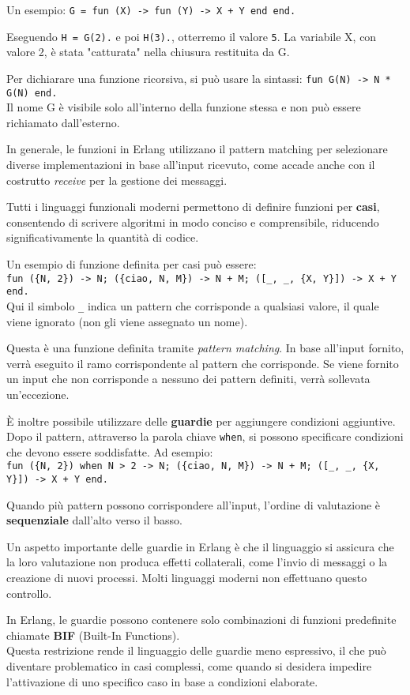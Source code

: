 \documentclass{article}
\begin{document}
Un esempio: \texttt{G = fun (X) -> fun (Y) -> X + Y end end.}

Eseguendo \texttt{H = G(2).} e poi \texttt{H(3).}, otterremo il valore \texttt{5}. La variabile X, con valore 2, è stata "catturata" nella chiusura restituita da G.

Per dichiarare una funzione ricorsiva, si può usare la sintassi: \texttt{fun G(N) -> N * G(N) end.}\\
Il nome G è visibile solo all'interno della funzione stessa e non può essere richiamato dall'esterno.

In generale, le funzioni in Erlang utilizzano il pattern matching per selezionare diverse implementazioni in base all'input ricevuto, come accade anche con il costrutto \textit{receive} per la gestione dei messaggi.

Tutti i linguaggi funzionali moderni permettono di definire funzioni per \textbf{casi}, consentendo di scrivere algoritmi in modo conciso e comprensibile, riducendo significativamente la quantità di codice.

Un esempio di funzione definita per casi può essere:\\
\texttt{fun (\{N, 2\}) -> N; (\{ciao, N, M\}) -> N + M; ([\_, \_, \{X, Y\}]) -> X + Y end.}\\
Qui il simbolo \texttt{\_} indica un pattern che corrisponde a qualsiasi valore, il quale viene ignorato (non gli viene assegnato un nome).

Questa è una funzione definita tramite \textit{pattern matching}. In base all'input fornito, verrà eseguito il ramo corrispondente al pattern che corrisponde. Se viene fornito un input che non corrisponde a nessuno dei pattern definiti, verrà sollevata un'eccezione.

È inoltre possibile utilizzare delle \textbf{guardie} per aggiungere condizioni aggiuntive. Dopo il pattern, attraverso la parola chiave \texttt{when}, si possono specificare condizioni che devono essere soddisfatte. Ad esempio:\\
\texttt{fun (\{N, 2\}) when N > 2 -> N; (\{ciao, N, M\}) -> N + M; ([\_, \_, \{X, Y\}]) -> X + Y end.}

Quando più pattern possono corrispondere all'input, l'ordine di valutazione è \textbf{sequenziale} dall'alto verso il basso.

Un aspetto importante delle guardie in Erlang è che il linguaggio si assicura che la loro valutazione non produca effetti collaterali, come l'invio di messaggi o la creazione di nuovi processi. Molti linguaggi moderni non effettuano questo controllo.

In Erlang, le guardie possono contenere solo combinazioni di funzioni predefinite chiamate \textbf{BIF} (Built-In Functions).\\
Questa restrizione rende il linguaggio delle guardie meno espressivo, il che può diventare problematico in casi complessi, come quando si desidera impedire l'attivazione di uno specifico caso in base a condizioni elaborate.
\end{document}
